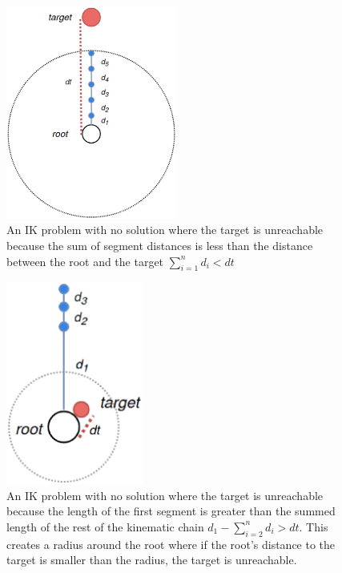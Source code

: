 \begin{figure}
    \centering
    \captionsetup{justification=centering}
    \includegraphics[width=0.5\textwidth]{grafika/unreachable_dist_1.eps}
    \caption{An IK problem with no solution where the target is unreachable
    because the sum of segment distances is less than the distance between the
    root and the target \(\sum_{i=1}^{n}d_i < dt\) }
    \label{fig:unreachable_dist1}
\end{figure}

\begin{figure}
    \centering
    \captionsetup{justification=centering}
    \includegraphics[width=0.4\textwidth]{grafika/unreachable_dist_2.eps}
    \caption{An IK problem with no solution where the target is unreachable
    because the length of the first segment is greater than the summed length of
    the rest of the kinematic chain \(d_1 - \sum_{i=2}^{n}d_i > dt\). This creates
    a radius around the root where if the root's distance to the target is
    smaller than the radius, the target is unreachable.
} \label{fig:unreachable_dist2}
\end{figure}

